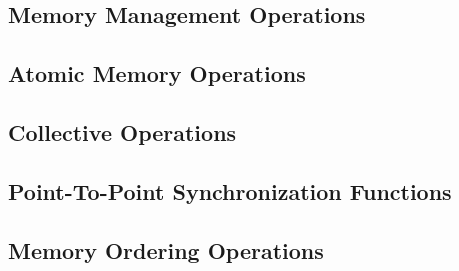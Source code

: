 \documentclass[10pt]{book}
\begin{document}
{\subsection{Memory Management Operations}

\label{subsec:shfree}

\label{subsec:shmem_put}
\label{subsec:shmem_p}
\label{subsec:shmem_get}
\label{subsec:shmem_g}
\subsection{Atomic Memory Operations}

\label{subsec:shmem_add}
\label{subsec:shmem_cswap}
\label{subsec:shmem_swap}
\label{subsec:shmem_finc}
\label{subsec:shmem_inc}
\label{subsec:shmem_fadd}
\subsection{Collective Operations}
\label{subsec:coll}

\label{subsec:shmem_barrier_all}
\label{subsec:shmem_barrier}
\label{subsec:shmem_broadcast}
\label{subsec:shmem_collect} %
\label{subsec:shmem_reductions}
\subsection{Point-To-Point Synchronization Functions}%
\label{subsec:shmem_wait}
\subsection{Memory Ordering Operations} %
\label{subsec:memory_order}
\label{subsec:shmem_fence}
\label{subsec:shmem_quiet}

}
\end{document}
